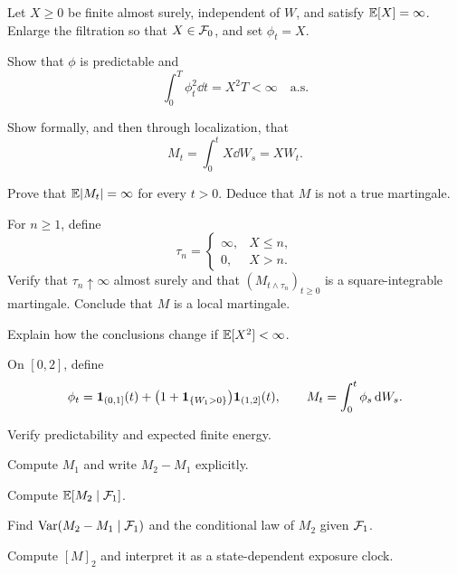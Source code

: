 \begin{exercise}
Let \(X\geq0\) be finite almost surely, independent of \(W\), and satisfy
\(\mathbb{E}[X]=\infty\). Enlarge the filtration so that \(X\in\mathcal{F}_0\), and set
\(\phi_t=X\).
\begin{exparts}
  \item Show that \(\phi\) is predictable and
  \[
  \int_0^T\phi_t^2\dd t=X^2T<\infty
  \quad\text{a.s.}
  \]
  \item Show formally, and then through localization, that
  \[
  M_t=\int_0^tX\dd W_s=XW_t.
  \]
  \item Prove that \(\mathbb{E}|M_t|=\infty\) for every \(t>0\). Deduce that \(M\)
  is not a true martingale.
  \item For \(n\geq1\), define
  \[
  \tau_n=
  \begin{cases}
  \infty,&X\leq n,\\
  0,&X>n.
  \end{cases}
  \]
  Verify that \(\tau_n\uparrow\infty\) almost surely and that
  \((M_{t\wedge\tau_n})_{t\geq0}\) is a square-integrable martingale.
  Conclude that \(M\) is a local martingale.
  \item Explain how the conclusions change if \(\mathbb{E}[X^2]<\infty\).
\end{exparts}
\end{exercise}

\begin{exercise}
On \([0,2]\), define
\[
\phi_t=\mathbf{1}_{(0,1]}(t)
+\bigl(1+\mathbf{1}_{\{W_1>0\}}\bigr)\mathbf{1}_{(1,2]}(t),
\qquad
M_t=\int_0^t\phi_s\,\mathrm{d} W_s.
\]
\begin{exparts}
  \item Verify predictability and expected finite energy.
  \item Compute \(M_1\) and write \(M_2-M_1\) explicitly.
  \item Compute \(\mathbb{E}[M_2\mid\mathcal{F}_1]\).
  \item Find \(\operatorname{Var}(M_2-M_1\mid\mathcal{F}_1)\) and the conditional law
  of \(M_2\) given \(\mathcal{F}_1\).
  \item Compute \([M]_2\) and interpret it as a state-dependent exposure
  clock.
\end{exparts}
\end{exercise}

